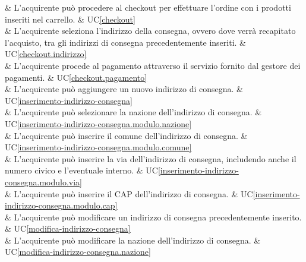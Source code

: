  & L'acquirente può procedere al checkout per effettuare l'ordine con i prodotti inseriti nel carrello. & UC\ref{checkout} \\

 & L'acquirente seleziona l'indirizzo della consegna, ovvero dove verrà recapitato l'acquisto, tra gli indirizzi di consegna precedentemente inseriti. & UC\ref{checkout.indirizzo} \\

 & L'acquirente procede al pagamento attraverso il servizio fornito dal gestore dei pagamenti. & UC\ref{checkout.pagamento} \\

 & L'acquirente può aggiungere un nuovo indirizzo di consegna. & UC\ref{inserimento-indirizzo-consegna} \\

 & L'acquirente può selezionare la nazione dell'indirizzo di consegna. & UC\ref{inserimento-indirizzo-consegna.modulo.nazione} \\

 & L'acquirente può inserire il comune dell'indirizzo di consegna. & UC\ref{inserimento-indirizzo-consegna.modulo.comune} \\

 & L'acquirente può inserire la via dell'indirizzo di consegna, includendo anche il numero civico e l'eventuale interno. & UC\ref{inserimento-indirizzo-consegna.modulo.via} \\

 & L'acquirente può inserire il CAP dell'indirizzo di consegna. & UC\ref{inserimento-indirizzo-consegna.modulo.cap} \\

 & L'acquirente può modificare un indirizzo di consegna precedentemente inserito. & UC\ref{modifica-indirizzo-consegna} \\

 & L'acquirente può modificare la nazione dell'indirizzo di consegna. & UC\ref{modifica-indirizzo-consegna.nazione} \\

